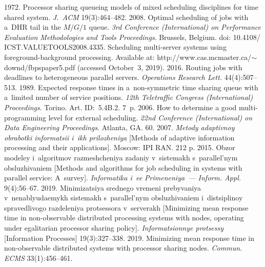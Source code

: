 \begin{multicols}{2}
{{\begin{thebibliography}{99}
    1972. Processor sharing queueing 
models of mixed scheduling disciplines for time shared system. \textit{J.~ACM} 
19(3):464--482.
    2008. Optimal scheduling of jobs with a~DHR tail 
in the $M/G/1$ queue. \textit{3rd  Conference (International) on 
Performance Evaluation Methodologies and Tools Proceedings}. Brussels, Belgium. doi: 
10.4108/\linebreak
 ICST.VALUETOOLS2008.4335. 
    Scheduling multi-server systems using 
foreground-background processing. Available at: {\sf 
http://www.cas.mcmaster.ca/$\sim$downd/fbpspaper5.pdf} (accessed October~3, 
2019).
    2016. Routing jobs with 
deadlines to heterogeneous parallel servers. \textit{Operations Research Lett.} 
44(4):507--513.
    1989. Expected response times in 
   a~non-symmetric time sharing queue with a~limited number of service positions. 
\textit{12th  Teletraffic Congress (International) Proceedings}. 
Torino. Art. ID:~5.4B.2. 7~p.
2006. How to determine a good multi-programming level for external scheduling. 
\textit{22nd  Conference (International) on Data Engineering Proceedings}. Atlanta, 
GA. 60.
    2007. \textit{Metody adaptivnoy obrabotki informatsii i~ikh 
prilozheniya} [Methods of adaptive information processing and their applications]. 
Moscow: IPI RAN. 212 p.
    2015. Obzor modeley 
   i~algoritmov razmeshcheniya zadaniy v~sistemakh s~parallel'nym obsluzhivaniem 
[Methods and algorithms for job scheduling in systems with parallel service: 
A~survey]. \textit{Informatika i~ee Primeneniya~--- Inform. Appl.} 9(4):56--67.
    2019. Mi\-ni\-mi\-za\-tsiya srednego 
vremeni prebyvaniya v~nenablyudaemykh sistemakh s~parallel'nym 
obsluzhivaniem i~dis\-tsip\-li\-noy spravedlivogo razdeleniya protsessora v~ser\-ve\-rakh 
[Minimizing mean response time in non-observable distributed
 processing systems 
with nodes, operating under egalitarian processor sharing policy]. \textit{Informatsionnye 
protsessy} [Information Processes] 19(3):327--338.
    2019. Minimizing mean 
response time in non-observable distributed systems with processor sharing 
nodes. \textit{Commun. ECMS} 33(1):456--461.
\end{thebibliography}

 }
 }

\end{multicols}

